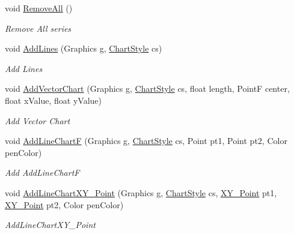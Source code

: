 \begin{DoxyCompactItemize}
void \mbox{\hyperlink{class_c_s_i_1_1_library_1_1_plotting_lib_1_1_data_collection_afebc78a783b9f67f7f1dd54170e96409}{Remove\+All}} ()
\begin{DoxyCompactList}\small\item\em Remove All series \end{DoxyCompactList}\item 
void \mbox{\hyperlink{class_c_s_i_1_1_library_1_1_plotting_lib_1_1_data_collection_a919e143a6d0cd54ff6b966a2ccac405b}{Add\+Lines}} (Graphics g, \mbox{\hyperlink{class_c_s_i_1_1_library_1_1_plotting_lib_1_1_chart_style}{Chart\+Style}} cs)
\begin{DoxyCompactList}\small\item\em Add Lines \end{DoxyCompactList}\item 
void \mbox{\hyperlink{class_c_s_i_1_1_library_1_1_plotting_lib_1_1_data_collection_a9e07b370a4d5442883ddbaf6c05a67ef}{Add\+Vector\+Chart}} (Graphics g, \mbox{\hyperlink{class_c_s_i_1_1_library_1_1_plotting_lib_1_1_chart_style}{Chart\+Style}} cs, float length, PointF center, float x\+Value, float y\+Value)
\begin{DoxyCompactList}\small\item\em Add Vector Chart \end{DoxyCompactList}\item 
void \mbox{\hyperlink{class_c_s_i_1_1_library_1_1_plotting_lib_1_1_data_collection_aa9a260d55d1ac192e4ab86480b5b75d5}{Add\+Line\+ChartF}} (Graphics g, \mbox{\hyperlink{class_c_s_i_1_1_library_1_1_plotting_lib_1_1_chart_style}{Chart\+Style}} cs, Point pt1, Point pt2, Color pen\+Color)
\begin{DoxyCompactList}\small\item\em Add Add\+Line\+ChartF \end{DoxyCompactList}\item 
void \mbox{\hyperlink{class_c_s_i_1_1_library_1_1_plotting_lib_1_1_data_collection_a3595484ae4eccdd8ed72cd671f32c8d0}{Add\+Line\+Chart\+X\+Y\+\_\+\+Point}} (Graphics g, \mbox{\hyperlink{class_c_s_i_1_1_library_1_1_plotting_lib_1_1_chart_style}{Chart\+Style}} cs, \mbox{\hyperlink{struct_c_s_i_1_1_library_1_1_data_types_1_1_x_y___point}{X\+Y\+\_\+\+Point}} pt1, \mbox{\hyperlink{struct_c_s_i_1_1_library_1_1_data_types_1_1_x_y___point}{X\+Y\+\_\+\+Point}} pt2, Color pen\+Color)
\begin{DoxyCompactList}\small\item\em Add\+Line\+Chart\+X\+Y\+\_\+\+Point \end{DoxyCompactList}\end{DoxyCompactItemize}
